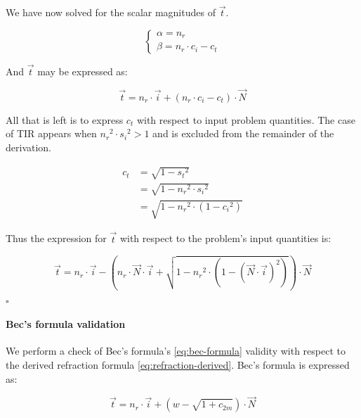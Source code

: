 We have now solved for the scalar magnitudes of $\overrightarrow{t}$.

\begin{equation} \begin{cases}
\alpha = n_r \\
\beta = n_r \cdot c_i - c_t
\end{cases} \end{equation}

And $\overrightarrow{t}$ may be expressed as:

\begin{equation}
\overrightarrow{t} = n_r \cdot \overrightarrow{i}
 + (n_r \cdot c_i - c_t) \cdot \overrightarrow{N}
\end{equation}

All that is left is to express $c_t$ with respect to input problem quantities.
The case of \gls{TIR} appears when ${n_r}^2 \cdot {s_i}^2 > 1$ and is excluded
from the remainder of the derivation.

\begin{equation} \begin{split}
c_t &= \sqrt{1 - {s_t}^2} \\
&= \sqrt{1 - {n_r}^2 \cdot {s_i}^2} \\
&= \sqrt{1 - {n_r}^2 \cdot (1 - {c_i}^2)}
\end{split} \end{equation}

Thus the expression for $\overrightarrow{t}$ with respect to the problem's input
quantities is:

\begin{equation} \label{eq:refraction-derived}
\overrightarrow{t} = n_r \cdot \overrightarrow{i} -
\left(n_r \cdot \overrightarrow{N} \cdot \overrightarrow{i}
+ \sqrt{1 - {n_r}^2 \cdot \left(1 - 
             \left(\overrightarrow{N} \cdot \overrightarrow{i}\right)^2\right)}
\right)
\cdot \overrightarrow{N}
\end{equation}

$\square$

\paragraph{Bec's formula validation}
We perform a check of Bec's formula's \cref{eq:bec-formula} validity with
respect to the derived refraction formula \cref{eq:refraction-derived}. Bec's
formula is expressed as:

\begin{equation}
\overrightarrow{t} = n_r \cdot \overrightarrow{i} +
(w - \sqrt{1 + c_{2m}}) \cdot \overrightarrow{N} 
\end{equation}

